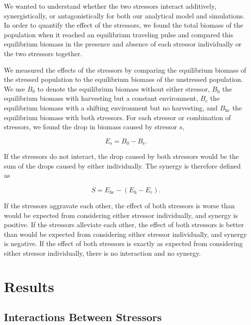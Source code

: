 \documentclass[12pt,english]{article}
\begin{document}
\begin{spacing}{1.9}
\begin{flushleft}
We wanted to understand whether the two stressors interact 
additively, synergistically, or antagonistically \citep{Crainetal2008} for both our analytical model and simulations. In order to quantify the effect of the 
stressors, we found the total biomass of the population when it reached an equilibrium traveling pulse and 
compared this equilibrium biomass in the presence and absence of each stressor individually or the two stressors together. 

We measured the effects of the stressors by comparing the equilibrium biomass of the stressed population to 
the equilibrium biomass of the unstressed population. We use $B_0$ to denote the equilibrium biomass 
without either stressor, $B_\text{h}$ the equilibrium biomass with harvesting but a constant environment, $B_\text{c}$ the 
equilibrium biomass with a shifting environment but no harvesting, and $B_\text{hc}$ the equilibrium biomass with 
both stressors. For each stressor or combination of stressors, we found the drop in  biomass caused 
by stressor $s$,

\[E_\text{s}=B_0-B_\text{s}.\]

\noindent If the stressors do not interact, the drop caused by both stressors would be the sum of the drops caused by 
either individually. The synergy is therefore defined as

\[S = E_\text{hc}-\left(E_\text{h}-E_\text{c}\right).\]

\noindent If the stressors aggravate each other, the effect of both stressors is worse than would be expected from 
considering either stressor individually, and synergy is positive. If the stressors alleviate each other, the effect 
of both stressors is better than would be expected from considering either stressor individually, and synergy is 
negative. If the effect of both stressors is exactly as expected from considering either stressor individually, 
there is no interaction and no synergy.

\section{Results}

\subsection{Interactions Between Stressors }


\end{flushleft}
\end{spacing}
\end{document}
